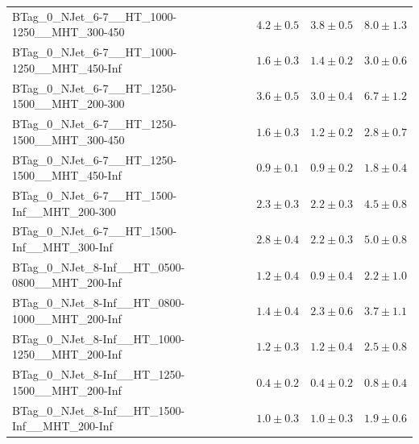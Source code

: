 \documentclass{beamer}
\begin{document}
\begin{frame}
\begin{tabular}{lrrr}
      BTag\_0\_NJet\_6-7\_\_HT\_1000-1250\_\_MHT\_300-450 &               $4.2\pm0.5$&               $3.8\pm0.5$&                   $8.0\pm1.3$ \\ 
      BTag\_0\_NJet\_6-7\_\_HT\_1000-1250\_\_MHT\_450-Inf &               $1.6\pm0.3$&               $1.4\pm0.2$&                   $3.0\pm0.6$ \\ 
      BTag\_0\_NJet\_6-7\_\_HT\_1250-1500\_\_MHT\_200-300 &               $3.6\pm0.5$&               $3.0\pm0.4$&                   $6.7\pm1.2$ \\ 
      BTag\_0\_NJet\_6-7\_\_HT\_1250-1500\_\_MHT\_300-450 &               $1.6\pm0.3$&               $1.2\pm0.2$&                   $2.8\pm0.7$ \\ 
      BTag\_0\_NJet\_6-7\_\_HT\_1250-1500\_\_MHT\_450-Inf &               $0.9\pm0.1$&               $0.9\pm0.2$&                   $1.8\pm0.4$ \\ 
       BTag\_0\_NJet\_6-7\_\_HT\_1500-Inf\_\_MHT\_200-300 &               $2.3\pm0.3$&               $2.2\pm0.3$&                   $4.5\pm0.8$ \\ 
       BTag\_0\_NJet\_6-7\_\_HT\_1500-Inf\_\_MHT\_300-Inf &               $2.8\pm0.4$&               $2.2\pm0.3$&                   $5.0\pm0.8$ \\ 
    BTag\_0\_NJet\_8-Inf\_\_HT\_0500-0800\_\_MHT\_200-Inf &               $1.2\pm0.4$&               $0.9\pm0.4$&                   $2.2\pm1.0$ \\ 
    BTag\_0\_NJet\_8-Inf\_\_HT\_0800-1000\_\_MHT\_200-Inf &               $1.4\pm0.4$&               $2.3\pm0.6$&                   $3.7\pm1.1$ \\ 
    BTag\_0\_NJet\_8-Inf\_\_HT\_1000-1250\_\_MHT\_200-Inf &               $1.2\pm0.3$&               $1.2\pm0.4$&                   $2.5\pm0.8$ \\ 
    BTag\_0\_NJet\_8-Inf\_\_HT\_1250-1500\_\_MHT\_200-Inf &               $0.4\pm0.2$&               $0.4\pm0.2$&                   $0.8\pm0.4$ \\ 
     BTag\_0\_NJet\_8-Inf\_\_HT\_1500-Inf\_\_MHT\_200-Inf &               $1.0\pm0.3$&               $1.0\pm0.3$&                   $1.9\pm0.6$ \\ 

\bottomrule 
\end{tabular}
\end{frame}
\end{document}
